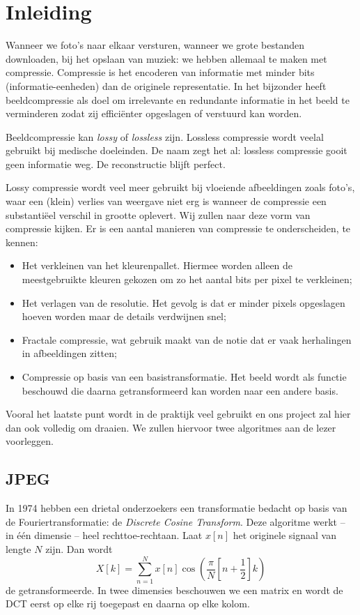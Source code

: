 \documentclass[11pt]{uvamath}
\theoremstyle{plain}
\theoremstyle{definition}
\theoremstyle{remark}
\begin{document}
\tableofcontents
\restoregeometry
\newpage

\chapter*{Inleiding}
Wanneer we foto's naar elkaar versturen, wanneer we grote bestanden downloaden, bij het opslaan van muziek: we hebben allemaal te maken met compressie. Compressie is het encoderen van informatie met minder bits (informatie-eenheden) dan de originele representatie. In het bijzonder heeft beeldcompressie als doel om irrelevante en redundante informatie in het beeld te verminderen zodat zij effici\"enter opgeslagen of verstuurd kan worden.

Beeldcompressie kan \emph{lossy} of \emph{lossless} zijn. Lossless compressie wordt veelal gebruikt bij medische doeleinden. De naam zegt het al: lossless compressie gooit geen informatie weg. De reconstructie blijft perfect.

Lossy compressie wordt veel meer gebruikt bij vloeiende afbeeldingen zoals foto's, waar een (klein) verlies van weergave niet erg is wanneer de compressie een substanti\"eel verschil in grootte oplevert. 
Wij zullen naar deze vorm van compressie kijken. Er is een aantal manieren van compressie te onderscheiden, te kennen:
\begin{itemize}
	\item Het verkleinen van het kleurenpallet. Hiermee worden alleen de meestgebruikte kleuren gekozen om zo het aantal bits per pixel te verkleinen;
	\item Het verlagen van de resolutie. Het gevolg is dat er minder pixels opgeslagen hoeven worden maar de details verdwijnen snel;
	\item Fractale compressie, wat gebruik maakt van de notie dat er vaak herhalingen in afbeeldingen zitten;
	\item Compressie op basis van een basistransformatie. Het beeld wordt als functie beschouwd die daarna getransformeerd kan worden naar een andere basis.
\end{itemize}
Vooral het laatste punt wordt in de praktijk veel gebruikt en ons project zal hier dan ook volledig om draaien.
We zullen hiervoor twee algoritmes aan de lezer voorleggen.

\section*{JPEG}
In 1974 hebben een drietal onderzoekers een transformatie bedacht op basis van de Fouriertransformatie: de \emph{Discrete Cosine Transform}. Deze algoritme werkt -- in \'e\'en dimensie -- heel rechttoe-rechtaan. Laat $x[n]$ het originele signaal van lengte $N$ zijn. Dan wordt
\[
	X[k] = \sum_{n=1}^N x[n] \cos\left(\frac{\pi}{N}\left[ n + \frac{1}{2}\right]k\right)
\]
de getransformeerde. In twee dimensies beschouwen we een matrix en wordt de DCT eerst op elke rij toegepast en daarna op elke kolom.
\end{document}
